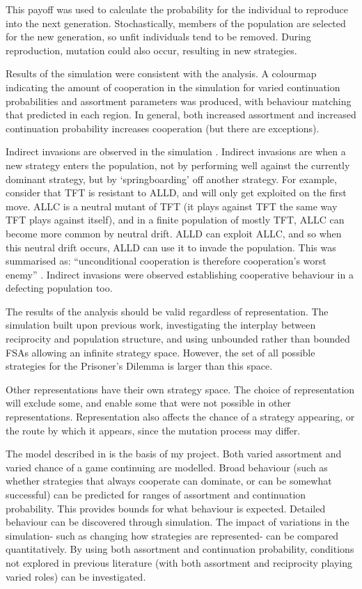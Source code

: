 \documentclass[a4paper,11pt,bcshonoursthesis,singlespace,oneside,thesisdraft,pdflatex]{cssethesis}
\begin{document}
This payoff was used to calculate the probability for the individual to reproduce into the next generation. Stochastically, members of the population are selected for the new generation, so unfit individuals tend to be removed. 
During reproduction, mutation could also occur, resulting in new strategies. 

Results of the simulation were consistent with the analysis. 
A colourmap indicating the amount of cooperation in the simulation for varied continuation probabilities and assortment parameters was produced, with behaviour matching that predicted in each region. 
In general, both increased assortment and increased continuation probability increases cooperation (but there are exceptions). 

Indirect invasions are observed in the simulation \citep{garcia:PLoSOne:2012}. 
Indirect invasions are when a new strategy enters the population, not by performing well against the currently dominant strategy, but by `springboarding' off another strategy. 
For example, consider that TFT is resistant to ALLD, and will only get exploited on the first move. 
ALLC is a neutral mutant of TFT (it plays against TFT the same way TFT plays against itself), and in a finite population of mostly TFT, ALLC can become more common by neutral drift. 
ALLD can exploit ALLC, and so when this neutral drift occurs, ALLD can use it to invade the population. 
This was summarised as: ``unconditional cooperation is therefore cooperation's worst enemy'' \citep{van-veelen:PNAS:2012}. 
Indirect invasions were observed establishing cooperative behaviour in a defecting population too. 

The results of the analysis should be valid regardless of representation. The simulation built upon previous work, investigating the interplay between reciprocity and population structure, and using unbounded rather than bounded FSAs allowing an infinite strategy space. 
However, the set of all possible strategies for the Prisoner's Dilemma is larger than this space. 

Other representations have their own strategy space. 
The choice of representation will exclude some, and enable some that were not possible in other representations. 
Representation also affects the chance of a strategy appearing, or the route by which it appears, since the mutation process may differ.
 
The model described in \citet{van-veelen:PNAS:2012} is the basis of my project. 
Both varied assortment and varied chance of a game continuing are modelled. 
Broad behaviour (such as whether strategies that always cooperate can dominate, or can be somewhat successful) can be predicted for ranges of assortment and continuation probability. This provides bounds for what behaviour is expected. 
Detailed behaviour can be discovered through simulation. 
The impact of variations in the simulation- such as changing how strategies are represented- can be compared quantitatively.
By using both assortment and continuation probability, conditions not explored in previous literature (with both assortment and reciprocity playing varied roles) can be investigated.
\end{document}
